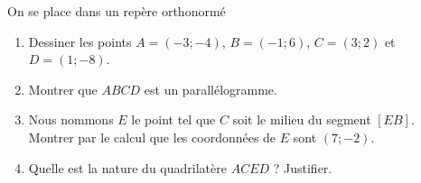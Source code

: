 
\begin{exercice}\label{exoSeconde-0021}

    On se place dans un repère orthonormé
    \begin{enumerate}
        \item
            Dessiner les points \( A=(-3;-4)\), \( B=(-1;6)\), \( C=(3;2)\) et \( D=(1;-8)\).
        \item
            Montrer que \( ABCD\) est un parallélogramme.
        \item
            Nous nommons \( E\) le point tel que \( C\) soit le milieu du segment \( [EB]\). Montrer par le calcul que les coordonnées de \( E\) sont \( (7;-2)\).
        \item
            Quelle est la nature du quadrilatère \( ACED\) ? Justifier.
    \end{enumerate}

\end{exercice}
